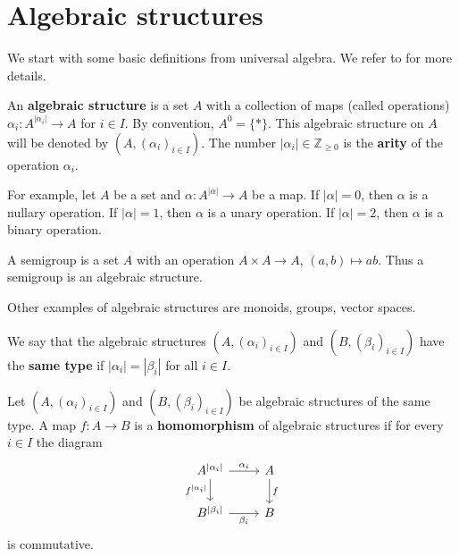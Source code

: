 \documentclass[graybox]{svmult}
\newcommand{\Z}{\mathbb{Z}}
\begin{document}
\section{Algebraic structures}

We start with some basic definitions from universal algebra. We refer
to \cite{MR620952} for more details. 

\begin{definition}
    An \textbf{algebraic structure} is a set $A$ 
    with a collection of maps (called operations) 
    $\alpha_i\colon A^{|\alpha_i|}\to A$ for $i\in I$. By 
    convention, $A^0=\{*\}$. This algebraic structure on $A$ 
    will be denoted by $(A,(\alpha_i)_{i\in I})$. 
    The number $|\alpha_i|\in\Z_{\geq0}$ is the
    \textbf{arity} of the operation $\alpha_i$. 
\end{definition}

For example, let $A$ be a set and 
$\alpha\colon A^{|\alpha|}\to A$ be a map. If $|\alpha|=0$, 
then $\alpha$ is a nullary operation. If $|\alpha|=1$, then 
$\alpha$ is a unary operation. If $|\alpha|=2$, then $\alpha$ is a binary operation. 

\begin{example}
    A semigroup is a set $A$ with an  
    operation $A\times A\to A$, $(a,b)\mapsto ab$. Thus 
    a semigroup 
    is an algebraic structure.
\end{example}

Other examples of algebraic structures are 
monoids, groups, vector spaces. 

\begin{definition}
    We say that the algebraic structures $(A,(\alpha_i)_{i\in I})$ and $(B,(\beta_i)_{i\in I})$ 
    have the \textbf{same type} if $|\alpha_i|=|\beta_i|$ for all $i\in I$.
\end{definition}

\begin{definition}
    Let $(A,(\alpha_i)_{i\in I})$ and $(B,(\beta_i)_{i\in I})$ be 
    algebraic structures of the same type. A map $f\colon A\to B$ 
    is a \textbf{homomorphism} of algebraic structures if 
    for every $i\in I$ the diagram 
    \[
    \begin{tikzcd}
	{A^{|\alpha_i|}} & A \\
	{B^{|\beta_i|}} & B
	\arrow["{\alpha_i}", from=1-1, to=1-2]
	\arrow["f", from=1-2, to=2-2]
	\arrow["{f^{|\alpha_i|}}"', from=1-1, to=2-1]
	\arrow["{\beta_i}"', from=2-1, to=2-2]
    \end{tikzcd}
    \]
    is commutative.     
\end{definition}
\end{document}
